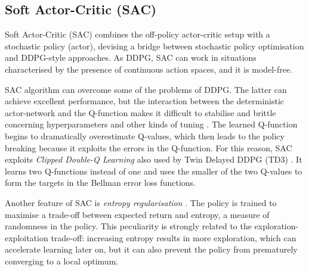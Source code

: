 %		
%		

\subsection{Soft Actor-Critic (SAC)} \label{sac}

Soft Actor-Critic (SAC) \cite{haarnoja2018soft, haarnoja2018alg} combines the off-policy actor-critic setup with a stochastic policy (actor), devising a bridge between stochastic policy optimisation and DDPG-style approaches.
As DDPG, SAC can work in situations characterised by the presence of continuous action spaces, and it is model-free.

SAC algorithm can overcome some of the problems of DDPG.
The latter can achieve excellent performance, but the interaction between the deterministic actor-network and the Q-function makes it difficult to stabilise and brittle concerning hyperparameters and other kinds of tuning \cite{duan2016benchmarking,henderson2018deep}.
The learned Q-function begins to dramatically overestimate Q-values, which then leads to the policy breaking because it exploits the errors in the Q-function.
For this reason, SAC exploits \textit{Clipped Double-Q Learning} also used by Twin Delayed DDPG (TD3) \cite{fujimoto2018addressing}.
It learns two Q-functions instead of one and uses the smaller of the two Q-values to form the targets in the Bellman error loss functions.

Another feature of SAC is \textit{entropy regularisation} \cite{ziebart2008maximum, toussaint2009robot, rawlik2013stochastic, fox2015taming, haarnoja2017reinforcement}.
The policy is trained to maximise a trade-off between expected return and entropy, a measure of randomness in the policy.
This peculiarity is strongly related to the exploration-exploitation trade-off: increasing entropy results in more exploration, which can accelerate learning later on, but it can also prevent the policy from prematurely converging to a local optimum.


